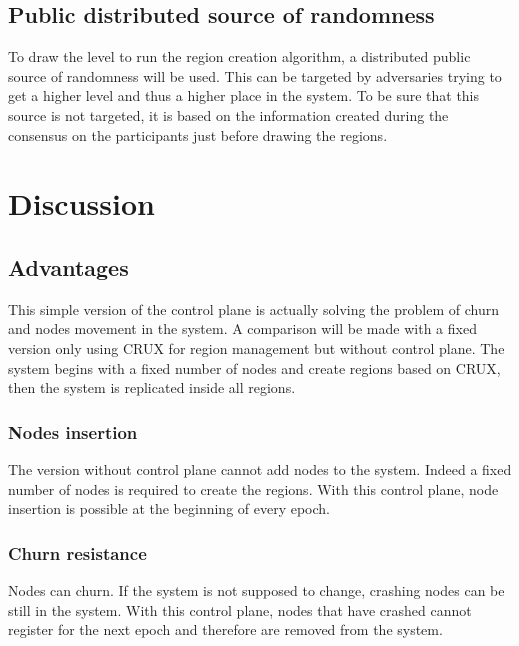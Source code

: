 \documentclass[a4paper,11pt,oneside]{report}
\begin{document}
\subsection{Public distributed source of randomness}
To draw the level to run the region creation algorithm, a distributed public
source of randomness will be used. This can be targeted by adversaries trying to
get a higher level and thus a higher place in the system. To be sure that this
source is not targeted, it is  based on the information created during the
consensus on the participants just before drawing the regions. 

\section{Discussion}
\subsection{Advantages}
This simple version of the control plane is actually solving the problem of
churn and nodes movement in the system. A comparison will be made with a fixed
version only using CRUX for region management but without control plane. The
system begins with a fixed number of nodes and create regions based on CRUX,
then the system is replicated inside all regions. 

\subsubsection{Nodes insertion}
The version without control plane cannot add nodes to the system. Indeed a
fixed number of nodes is required to create the regions. With this control
plane, node insertion is possible at the beginning of every epoch.

\subsubsection{Churn resistance}
Nodes can churn. If the system is not supposed to change, crashing nodes can be
still in the system. With this control plane, nodes that have crashed cannot
register for the next epoch and therefore are removed from the system. 
\end{document}
